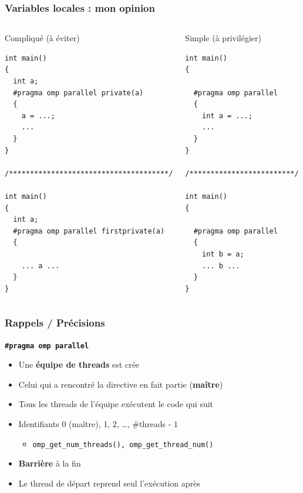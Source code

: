 \documentclass{beamer}
\begin{document}
\begin{frame}[fragile]
  \frametitle{Variables locales : mon opinion}


  \begin{columns}[t]
  \column[T]{6cm}
  \begin{alertblock}{Compliqué (à éviter)}
    \begin{verbatim}
int main()
{
  int a;
  #pragma omp parallel private(a)
  {
    a = ...;
    ...
  }
}

/**************************************/

int main()
{
  int a;
  #pragma omp parallel firstprivate(a)
  {

    ... a ...
  }
}

\end{verbatim}
\end{alertblock}

  \column[T]{4cm}
  \begin{exampleblock}{Simple (à privilégier)}
    \begin{verbatim}
int main()
{
  
  #pragma omp parallel
  {
    int a = ...;
    ...
  }
}

/*************************/

int main()
{
  
  #pragma omp parallel
  {
    int b = a;
    ... b ...
  }
}
\end{verbatim}
\end{exampleblock}
\end{columns}

\end{frame}

\begin{frame}[fragile]
  \frametitle{Rappels / Précisions}
  
\begin{block}{\bf \texttt{\#pragma omp parallel}}
  \begin{itemize}
  \item Une \alert{\textbf{équipe de threads}} est crée
  \item Celui qui a rencontré la directive en fait partie (\textbf{maître})
  \item Tous les threads de l'équipe exécutent le code qui suit
  \item Identifiants 0 (maître), 1, 2, \dots, \#threads - 1
    \begin{itemize}
      \item \texttt{omp_get_num_threads(), omp_get_thread_num()}
    \end{itemize}
  \item \textbf{Barrière} à la fin
  \item Le thread de départ reprend seul l'exécution après
  \end{itemize}
\end{block}

  
\end{frame}
\end{document}
